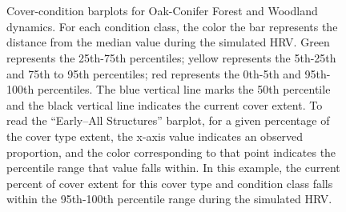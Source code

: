 \begin{figure}[!htbp]
  \\%
  \\%
    \\%
    \\%
    \\%
    \\%
    \\%
  \caption{Cover-condition barplots for Oak-Conifer Forest and Woodland dynamics. For each condition class, the color the bar represents the distance from the median value during the simulated HRV. Green represents the 25th-75th percentiles; yellow represents the 5th-25th and 75th to 95th percentiles; red represents the 0th-5th and 95th-100th percentiles. The blue vertical line marks the 50th percentile and the black vertical line indicates the current cover extent. To read the ``Early–All Structures'' barplot, for a given percentage of the cover type extent, the x-axis value indicates an observed proportion, and the color corresponding to that point indicates the percentile range that value falls within. In this example, the current percent of cover extent for this cover type and condition class falls within the 95th-100th percentile range during the simulated HRV.}
  \label{fig:covcondbar_ocfw}
\end{figure}

